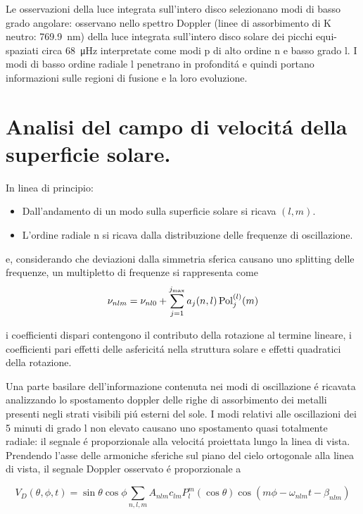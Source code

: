 \documentclass[../main.tex]{subfiles}
\begin{document}
Le osservazioni della luce integrata sull'intero disco selezionano modi di basso grado angolare: \citet{cla79solar} osservano nello spettro Doppler (linee di assorbimento di K neutro: \SI{769.9}{\nano\meter}) della luce integrata sull'intero disco solare dei picchi equi-spaziati circa \SI{68}{\micro\hertz} interpretate come modi p di alto ordine n e basso grado l. I modi di basso ordine radiale l penetrano in profondit\'a e quindi portano informazioni sulle regioni di fusione e la loro evoluzione.

\section{Analisi del campo di velocit\'a della superficie solare.}

In linea di principio:

\begin{itemize}
    \item Dall'andamento di un modo sulla superficie solare si ricava $(l,m)$.
    \item L'ordine radiale n si ricava dalla distribuzione delle frequenze di oscillazione.
\end{itemize}

e, considerando che deviazioni dalla simmetria sferica causano uno splitting delle frequenze, un multipletto di frequenze si rappresenta come
\begin{equation}
\nu_{nlm}=\nu_{nl0}+\sum_{j=1}^{j_{\max}}a_j(n,l)\operatorname{Pol}_j^{(l)}(m)\label{eq:freqmulti}
\end{equation}

i coefficienti dispari contengono il contributo della rotazione al termine lineare, i coefficienti pari effetti delle asfericit\'a nella struttura solare e effetti quadratici della rotazione.

Una parte basilare dell'informazione contenuta nei modi di oscillazione \'e ricavata analizzando  lo spostamento doppler delle righe di assorbimento dei metalli presenti negli strati visibili pi\'u esterni del sole.
I modi relativi alle oscillazioni dei 5 minuti di grado l non elevato causano uno spostamento quasi totalmente radiale: il segnale \'e proporzionale alla velocit\'a proiettata lungo la linea di vista. Prendendo l'asse delle armoniche sferiche sul piano del cielo ortogonale alla linea di vista, il segnale Doppler osservato \'e proporzionale a

\begin{equation}
    V_D(\theta,\phi,t)=\sin{\theta}\cos{\phi}\sum_{n,l,m}A_{nlm}c_{lm}P_l^m(\cos{\theta})\cos{(m\phi-\omega_{nlm}t-\beta_{nlm})}
\end{equation}
\end{document}
